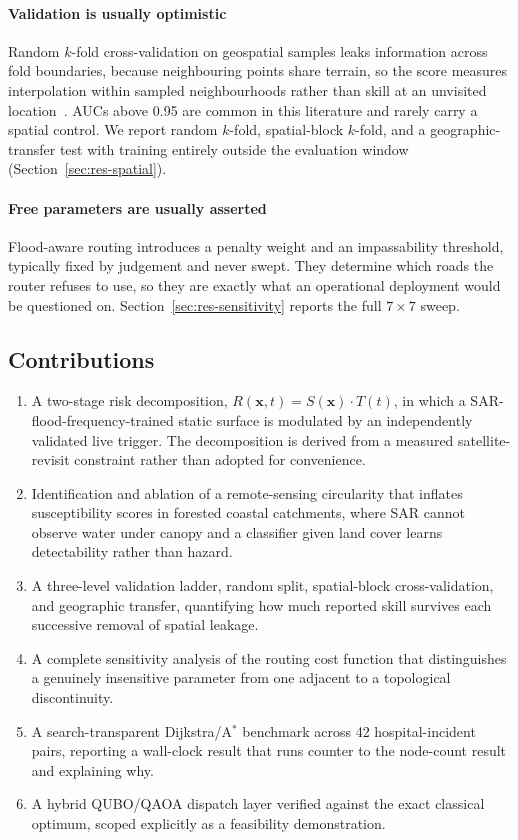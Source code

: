 \documentclass[10pt,twocolumn]{article}
\newcommand{\Sx}{S(\mathbf{x})}
\newcommand{\Tt}{T(t)}
\newcommand{\Rxt}{R(\mathbf{x},t)}
\begin{document}
\paragraph{Validation is usually optimistic}
Random $k$-fold cross-validation on geospatial samples leaks information across
fold boundaries, because neighbouring points share terrain, so the score measures
interpolation within sampled neighbourhoods rather than skill at an unvisited
location~\citep{roberts2017,ploton2020,meyer2021}. AUCs above 0.95 are common in
this literature and rarely carry a spatial control. We report random $k$-fold,
spatial-block $k$-fold, and a geographic-transfer test with training entirely
outside the evaluation window (Section~\ref{sec:res-spatial}).

\paragraph{Free parameters are usually asserted}
Flood-aware routing introduces a penalty weight and an impassability threshold,
typically fixed by judgement and never swept. They determine which roads the
router refuses to use, so they are exactly what an operational deployment would
be questioned on. Section~\ref{sec:res-sensitivity} reports the full
$7\times7$ sweep.

\subsection{Contributions}
\begin{enumerate}
\itemsep2pt
\item A two-stage risk decomposition, $\Rxt=\Sx\cdot\Tt$, in which a
      SAR-flood-frequency-trained static surface is modulated by an independently
      validated live trigger. The decomposition is derived from a measured
      satellite-revisit constraint rather than adopted for convenience.
\item Identification and ablation of a remote-sensing circularity that inflates
      susceptibility scores in forested coastal catchments, where SAR cannot
      observe water under canopy and a classifier given land cover learns
      detectability rather than hazard.
\item A three-level validation ladder, random split, spatial-block
      cross-validation, and geographic transfer, quantifying how much reported
      skill survives each successive removal of spatial leakage.
\item A complete sensitivity analysis of the routing cost function that
      distinguishes a genuinely insensitive parameter from one adjacent to a
      topological discontinuity.
\item A search-transparent Dijkstra/A$^\ast$ benchmark across 42
      hospital-incident pairs, reporting a wall-clock result that runs counter to
      the node-count result and explaining why.
\item A hybrid QUBO/QAOA dispatch layer verified against the exact classical
      optimum, scoped explicitly as a feasibility demonstration.
\end{enumerate}
\end{document}
